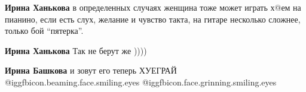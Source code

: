 \begin{itemize}
\begin{itemize} %
\textbf{Ирина Ханькова} в определенных случаях женщина тоже может играть х@ем на пианино, если есть слух, желание и чувство такта, на гитаре несколько сложнее, только бой \enquote{пятерка}.

\textbf{Ирина Ханькова}
Так не берут же ))))

\textbf{Ирина Башкова} и зовут его теперь ХУЕГРАЙ @igg{fbicon.beaming.face.smiling.eyes}  @igg{fbicon.face.grinning.smiling.eyes} 
\end{itemize} %





\end{itemize} %
